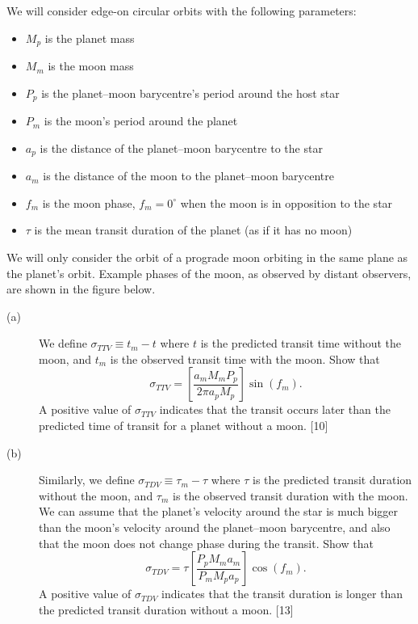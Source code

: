 We will consider edge-on circular orbits with the following parameters:
\begin{itemize}\itemsep2pt
\item $M_p$ is the planet mass
\item $M_m$ is the moon mass
\item $P_p$ is the planet--moon barycentre's period around the host star
\item $P_m$ is the moon's period around the planet
\item $a_p$ is the distance of the planet--moon barycentre to the star
\item $a_m$ is the distance of the moon to the planet--moon barycentre
\item $f_m$ is the moon phase, $f_m = 0^\circ$ when the moon is in opposition to
  the star
\item $\tau$ is the mean transit duration of the planet (as if it has no moon)
\end{itemize}

We will only consider the orbit of a prograde moon orbiting in the same plane as
the planet's orbit. Example phases of the moon, as observed by distant
observers, are shown in the figure below.


\begin{description}
\item[(a)] We define $\sigma_{TTV} \equiv t_m - t$ where $t$ is the predicted
  transit time without the moon, and $t_m$ is the observed transit time with the
  moon. Show that
  \[ \sigma_{TTV} = \left[\frac{a_m M_m P_p}{2\pi a_p M_p}\right]\sin(f_m). \]
  A positive value of $\sigma_{TTV}$ indicates that the transit occurs later
  than the predicted time of transit for a planet without a moon. \hfill[10]
\item[(b)] Similarly, we define $\sigma_{TDV} \equiv \tau_m - \tau$ where $\tau$
  is the predicted transit duration without the moon, and $\tau_m$ is the
  observed transit duration with the moon. We can assume that the planet's
  velocity around the star is much bigger than the moon's velocity around the
  planet--moon barycentre, and also that the moon does not change phase during
  the transit. Show that
  \[ \sigma_{TDV} = \tau\left[\frac{P_p M_m a_m}{P_m M_p a_p}\right]\cos(f_m). \]
  A positive value of $\sigma_{TDV}$ indicates that the transit duration is
  longer than the predicted transit duration without a moon. \hfill[13]
\end{description}

